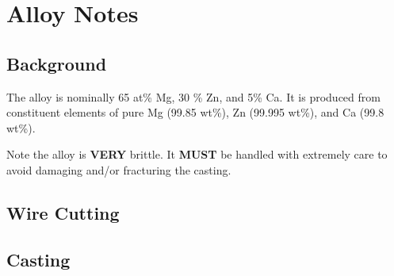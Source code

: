 \section{\MgZnCa Alloy Notes}

\subsection{Background}

The \MgZnCa alloy is nominally 65 at\% Mg, 30 \% Zn, and 5\% Ca. It is produced from constituent elements of pure Mg (99.85 wt\%), Zn (99.995 wt\%), and Ca (99.8 wt\%). 

Note the \MgZnCa alloy is \textbf{VERY} brittle. It \textbf{MUST} be handled with extremely care to avoid damaging and/or fracturing the casting.

\subsection{Wire Cutting}


\subsection{Casting}

